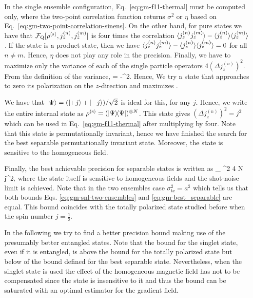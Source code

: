 In the single ensemble configuration, Eq.~\eqref{eq:gm-f11-thermal} must be computed only, where the two-point correlation function returns $\sigma^2$ or $\eta$ based on Eq.~\eqref{eq:gm-two-point-correlation-sinens}.
On the other hand, for pure states we have that $\mathcal{F}_{\textnormal{Q}}[{\textstyle \rho^{(\text{s})}, j_z^{(n)}, j_z^{(m)}}]$ is four times the correlation $\langle{j_z^{(n)}j_z^{(m)}}\rangle-\langle{j_z^{(n)}}\rangle\langle{j_z^{(m)}}\rangle$.
If the state is a product state, then we have  $\langle{j_z^{(n)}j_z^{(m)}}\rangle-\langle{j_z^{(n)}}\rangle\langle{j_z^{(m)}}\rangle=0$ for all $n\neq m$.
Hence, $\eta$ does not play any role in the precision.
Finally, we have to maximize only the variance of each of the single particle operators $4(\Delta j_z^{(n)})^2$.
From the definition of the variance,
\be
   = -^2.
\ee
Hence, We try a state that approaches to zero its polarization on the $z$-direction and maximizes .

We have that  $\vert{\Psi}\rangle=(\vert{+j}\rangle+\vert{-j}\rangle)/\sqrt{2}$ is ideal for this, for any $j$.
Hence, we write the entire internal state as $\rho^{(\text{s})} =(\vert{\Psi}\rangle{\!}\langle{\Psi}\vert)^{\otimes N}$.
This state gives $(\Delta j_z^{(n)})^2=j^2$ which can be used in Eq.~\eqref{eq:gm-f11-thermal} after multiplying by four.
Note that this state is permutationally invariant, hence we have finished the search for the best separable permutationally invariant state.
Moreover, the state is sensitive to the homogeneous field.

Finally, the best achievable precision for separable states is written as
\be
  _{} \leqslant  \sigma^2 4 N j^2,
  \label{eq:gm-best_separable}
\ee
where the state itself is sensitive to homogeneous fields and the shot-noise limit is achieved.
Note that in the two ensembles case $\sigma^2_{\text{te}}=a^2$ which tells us that both bounds Eqs. \eqref{eq:gm-snl-two-ensembles} and \eqref{eq:gm-best_separable} are equal.
This bound coincides with the totally polarized state studied before when the spin number $j=\frac{1}{2}$.

In the following we try to find a better precision bound making use of the presumably better entangled states.
Note that the bound for the singlet state, even if it is entangled, is above the bound for the totally polarized state but below of the bound defined for the best separable state.
Nevertheless, when the singlet state is used the effect of the homogeneous magnetic field has not to be compensated since the state is insensitive to it and thus the bound can be saturated with an optimal estimator for the gradient field.


